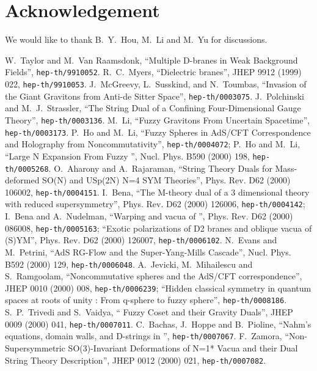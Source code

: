 \documentclass[a4paper,12pt]{article}
\begin{document}
{\section *{Acknowledgement}
We would like to thank B.~Y.~Hou, M.~Li and M.~Yu for discussions.
\newpage
\begin{thebibliography}{30}
 W.~Taylor and M.~Van Raamsdonk, ``Multiple D\coordHE{}-branes in Weak Background Fields'', {\tt hep-th/9910052}.
 R.~C.~Myers, ``Dielectric branes'', JHEP 9912 (1999) 022, {\tt hep-th/9910053}.
 J.~McGreevy, L.~Susskind, and N.~Toumbas, ``Invasion of the Giant Gravitons from Anti-de Sitter Space'', {\tt hep-th/0003075}.
 J.~Polchinski and M.~J.~Strassler, ``The String Dual of a Confining Four-Dimensional Gauge Theory'', {\tt hep-th/0003136}.
 M.~Li, ``Fuzzy Gravitons From Uncertain Spacetime'', {\tt hep-th/0003173}.
 P.~Ho and M.~Li, ``Fuzzy Spheres in AdS/CFT Correspondence and Holography from Noncommutativity'', {\tt hep-th/0004072};
P.~Ho and M.~Li, ``Large N Expansion From Fuzzy \coordHE{}'', Nucl. Phys. B590 (2000) 198, {\tt hep-th/0005268}.
 O.~Aharony and A.~Rajaraman, ``String Theory Duals for Mass-deformed SO(N) and USp(2N) N=4 SYM Theories'', Phys. Rev. D62 (2000) 106002, {\tt hep-th/0004151}.
 I.~Bena, ``The M-theory dual of a 3 dimensional theory with reduced supersymmetry'', Phys. Rev. D62 (2000) 126006, {\tt hep-th/0004142};
I.~Bena and A.~Nudelman, ``Warping and vacua of \coordHE{}'', Phys. Rev. D62 (2000) 086008, {\tt hep-th/0005163};
``Exotic polarizations of D2 branes and oblique vacua of (S)YM\coordHE{}'', Phys. Rev. D62 (2000) 126007, {\tt hep-th/0006102}.
 N.~Evans and M.~Petrini, ``AdS RG-Flow and the Super-Yang-Mills Cascade'', Nucl. Phys. B592 (2000) 129, {\tt hep-th/0006048}.
 A.~Jevicki, M.~Mihailescu and S.~Ramgoolam, ``Noncommutative spheres and the AdS/CFT correspondence'', JHEP 0010 (2000) 008, {\tt hep-th/0006239}; ``Hidden classical symmetry in quantum spaces at roots of unity : From q-sphere to fuzzy sphere'', {\tt hep-th/0008186}.
 S.~P.~Trivedi and S.~Vaidya, `` Fuzzy Coset and their Gravity Duals'', JHEP 0009 (2000) 041, {\tt hep-th/0007011}.
 C.~Bachas, J.~Hoppe and B.~Pioline, ``Nahm's equations, \coordHE{} domain walls, and D-strings in \coordHE{}'', {\tt hep-th/0007067}.
  F.~Zamora, ``Non-Supersymmetric SO(3)-Invariant Deformations of N=1* Vacua and their Dual String Theory Description'', JHEP 0012 (2000) 021, {\tt hep-th/0007082}.

\end{thebibliography}}
\end{document}
